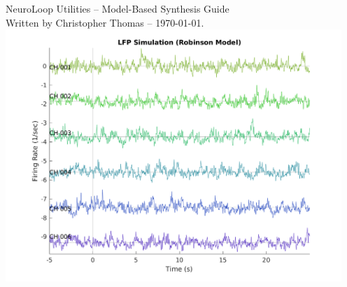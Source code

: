 \documentclass[letterpaper,11pt]{report}
\begin{document}
%
%
\pagestyle{empty}

\begin{center}
%
\vspace*{1in}
{\huge NeuroLoop Utilities -- Model-Based Synthesis Guide} \\
{\footnotesize Written by Christopher Thomas -- \today.}
%
\vspace*{1.5in}\\
\includegraphics[width=5in]{plots/20231205/lfp-simulation-robinson-model}
%
\end{center}
%
\vfill
{\tiny }
%
\clearpage
%
%
%
\pagestyle{plain}
\setcounter{page}{1}
%
\tableofcontents
%
\clearpage
%
%
%
\pagestyle{plain}
\setcounter{page}{1}
%


%
%
\end{document}
